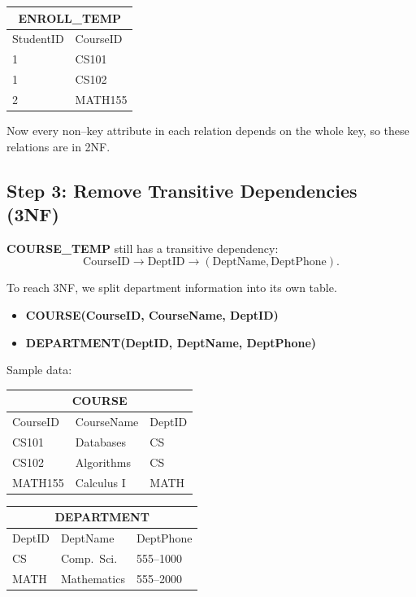 \documentclass{article}
\begin{document}
\begin{center}
\begin{tabular}{ll}
\toprule
\multicolumn{2}{c}{\textbf{ENROLL\_TEMP}} \\
\midrule
StudentID & CourseID \\
\midrule
1 & CS101 \\
1 & CS102 \\
2 & MATH155 \\
\bottomrule
\end{tabular}
\end{center}

Now every non--key attribute in each relation depends on the whole key,
so these relations are in 2NF.

\bigskip

\subsection*{Step 3: Remove Transitive Dependencies (3NF)}

\textbf{COURSE\_TEMP} still has a transitive dependency:
\[
\text{CourseID} \to \text{DeptID} \to
(\text{DeptName}, \text{DeptPhone}).
\]

To reach 3NF, we split department information into its own table.

\begin{itemize}
  \item \textbf{COURSE(CourseID, CourseName, DeptID)}
  \item \textbf{DEPARTMENT(DeptID, DeptName, DeptPhone)}
\end{itemize}

Sample data:

\begin{center}
\begin{tabular}{lll}
\toprule
\multicolumn{3}{c}{\textbf{COURSE}} \\
\midrule
CourseID & CourseName & DeptID \\
\midrule
CS101  & Databases   & CS \\
CS102  & Algorithms  & CS \\
MATH155 & Calculus I & MATH \\
\bottomrule
\end{tabular}
\hspace{2em}
\begin{tabular}{lll}
\toprule
\multicolumn{3}{c}{\textbf{DEPARTMENT}} \\
\midrule
DeptID & DeptName   & DeptPhone \\
\midrule
CS   & Comp.~Sci.  & 555--1000 \\
MATH & Mathematics & 555--2000 \\
\bottomrule
\end{tabular}
\end{center}
\end{document}
